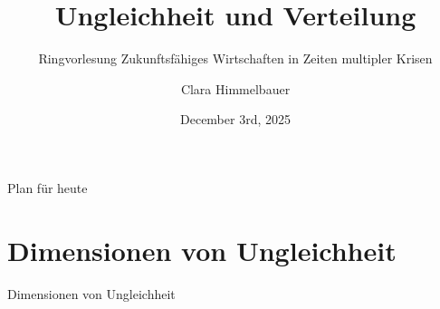 \documentclass[aspectratio=169,xcolor=dvipsnames]{beamer}
\title{Ungleichheit und Verteilung}
\subtitle{Ringvorlesung Zukunftsfähiges Wirtschaften in Zeiten multipler Krisen}
\author{Clara Himmelbauer}
\institute
{
    Research Institute Economics of Inequality (INEQ) \\
    WU Vienna %
}
\date{December 3rd, 2025} %
\begin{document}
\begin{frame}
    \titlepage
\end{frame}


\begin{frame}{Plan für heute}

    \tableofcontents
\end{frame}

\section{Dimensionen von Ungleichheit}

\begin{frame}[plain,c]
    \begin{center}
    \color{DarkBlue}
        Dimensionen von Ungleichheit
    \end{center}
\end{frame}
\end{document}
